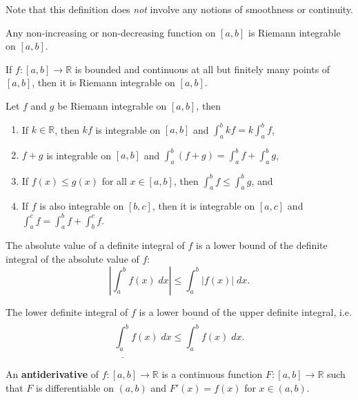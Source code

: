 \documentclass[twoside,10pt]{report}
\begin{document}
Note that this definition does \textit{not} involve any notions of smoothness or continuity.

\begin{thrm}{}{}
	Any non-increasing or non-decreasing function on $[a,b]$ is Riemann integrable on $[a,b]$.
\end{thrm}

\begin{thrm}{}{}
	If $f:[a,b]\to\mathbb{R}$ is bounded and continuous at all but finitely many points of $[a,b]$, then it is Riemann integrable on $[a,b]$.
\end{thrm}

\begin{prop}
	\label{prop:integral-props}
	Let $f$ and $g$ be Riemann integrable on $[a,b]$, then
	\begin{enumerate}
		\item If $k\in\mathbb{R}$, then $kf$ is integrable on $[a,b]$ and $\int_{a}^{b} kf = k \int_{a}^{b} f$,
		\item $f+g$ is integrable on $[a,b]$ and $\int_{a}^{b} (f+g)=\int_{a}^{b} f+\int_{a}^{b} g$,
		\item If $f(x) \leq g(x)$ for all $x \in [a,b]$, then $\int_{a}^{b} f \leq \int_{a}^{b} g$, and
		\item If $f$ is also integrable on $[b,c]$, then it is integrable on $[a,c]$ and $\int_{a}^{c} f = \int_{a}^{b} f + \int_{b}^{c} f$.
	\end{enumerate}
\end{prop}

\begin{cor}
	The absolute value of a definite integral of $f$ is a lower bound of the definite integral of the absolute value of $f$:
	\[
		\left| \int_{a}^{b} f(x) \;dx \right| \leq \int_{a}^{b} |f(x)| \;dx.
	\] 
\end{cor}

\newpage
\begin{prop}
	The lower definite integral of $f$ is a lower bound of the upper definite integral, i.e.
	\[
		\underline{\int_{a}^{b}} f(x) \;dx \leq \overline{\int_{a}^{b} } f(x) \;dx.
	\] 
\end{prop}

\begin{defn}[]
	An \textbf{antiderivative} of $f:[a,b] \to \mathbb{R}$ is a continuous function $F:[a,b]\to\mathbb{R}$ such that $F$ is differentiable on $(a,b)$ and $F'(x)=f(x)$ for $x\in(a,b)$.
\end{defn}
\end{document}
